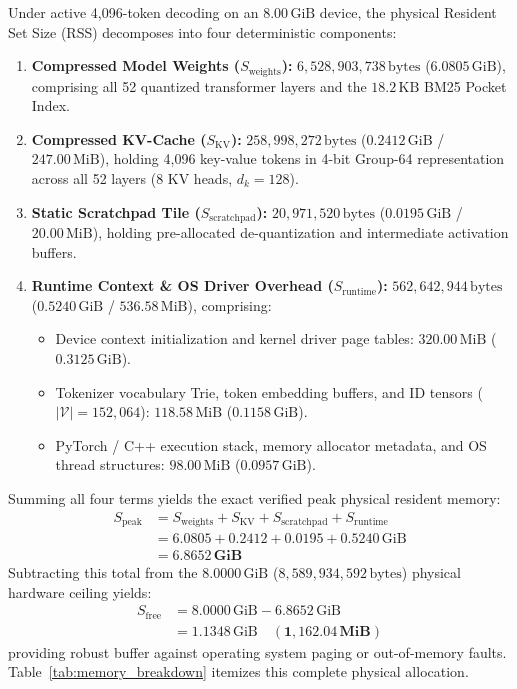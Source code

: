 \documentclass[10pt,twocolumn,letterpaper]{article}
\begin{document}
Under active 4,096-token decoding on an $8.00\,\text{GiB}$ device, the physical Resident Set Size (RSS) decomposes into four deterministic components:
\begin{enumerate}[leftmargin=*]
    \item \textbf{Compressed Model Weights ($S_{\text{weights}}$):} $6,528,903,738\,\text{bytes}$ ($6.0805\,\text{GiB}$), comprising all 52 quantized transformer layers and the $18.2\,\text{KB}$ BM25 Pocket Index.
    \item \textbf{Compressed KV-Cache ($S_{\text{KV}}$):} $258,998,272\,\text{bytes}$ ($0.2412\,\text{GiB}$ / $247.00\,\text{MiB}$), holding 4,096 key-value tokens in 4-bit Group-64 representation across all 52 layers (8 KV heads, $d_k=128$).
    \item \textbf{Static Scratchpad Tile ($S_{\text{scratchpad}}$):} $20,971,520\,\text{bytes}$ ($0.0195\,\text{GiB}$ / $20.00\,\text{MiB}$), holding pre-allocated de-quantization and intermediate activation buffers.
    \item \textbf{Runtime Context \& OS Driver Overhead ($S_{\text{runtime}}$):} $562,642,944\,\text{bytes}$ ($0.5240\,\text{GiB}$ / $536.58\,\text{MiB}$), comprising:
    \begin{itemize}
        \item Device context initialization and kernel driver page tables: $320.00\,\text{MiB}$ ($0.3125\,\text{GiB}$).
        \item Tokenizer vocabulary Trie, token embedding buffers, and ID tensors ($|\mathcal{V}|=152,064$): $118.58\,\text{MiB}$ ($0.1158\,\text{GiB}$).
        \item PyTorch / C++ execution stack, memory allocator metadata, and OS thread structures: $98.00\,\text{MiB}$ ($0.0957\,\text{GiB}$).
    \end{itemize}
\end{enumerate}

Summing all four terms yields the exact verified peak physical resident memory:
\begin{equation}
\begin{aligned}
    S_{\text{peak}} &= S_{\text{weights}} + S_{\text{KV}} + S_{\text{scratchpad}} + S_{\text{runtime}} \\
    &= 6.0805 + 0.2412 + 0.0195 + 0.5240\,\text{GiB} \\
    &= \mathbf{6.8652\,\text{GiB}}
\end{aligned}
\end{equation}
Subtracting this total from the $8.0000\,\text{GiB}$ ($8,589,934,592\,\text{bytes}$) physical hardware ceiling yields:
\begin{equation}
\begin{aligned}
    S_{\text{free}} &= 8.0000\,\text{GiB} - 6.8652\,\text{GiB} \\
    &= 1.1348\,\text{GiB} \quad (\mathbf{1,162.04\,\text{MiB}})
\end{aligned}
\end{equation}
providing robust buffer against operating system paging or out-of-memory faults. Table~\ref{tab:memory_breakdown} itemizes this complete physical allocation.
\end{document}
